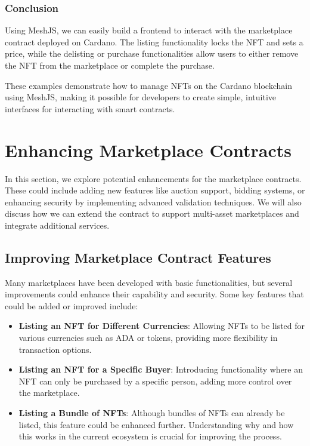 \subsubsection{Conclusion}

Using MeshJS, we can easily build a frontend to interact with the marketplace contract deployed on Cardano. The listing functionality locks the NFT and sets a price, while the delisting or purchase functionalities allow users to either remove the NFT from the marketplace or complete the purchase.

These examples demonstrate how to manage NFTs on the Cardano blockchain using MeshJS, making it possible for developers to create simple, intuitive interfaces for interacting with smart contracts.


\section{Enhancing Marketplace Contracts}

In this section, we explore potential enhancements for the marketplace contracts. These could include adding new features like auction support, bidding systems, or enhancing security by implementing advanced validation techniques. We will also discuss how we can extend the contract to support multi-asset marketplaces and integrate additional services.

\subsection{Improving Marketplace Contract Features}

Many marketplaces have been developed with basic functionalities, but several improvements could enhance their capability and security. Some key features that could be added or improved include:

\begin{itemize}
    \item \textbf{Listing an NFT for Different Currencies}: Allowing NFTs to be listed for various currencies such as ADA or tokens, providing more flexibility in transaction options.
    \item \textbf{Listing an NFT for a Specific Buyer}: Introducing functionality where an NFT can only be purchased by a specific person, adding more control over the marketplace.
    \item \textbf{Listing a Bundle of NFTs}: Although bundles of NFTs can already be listed, this feature could be enhanced further. Understanding why and how this works in the current ecosystem is crucial for improving the process.
\end{itemize}

